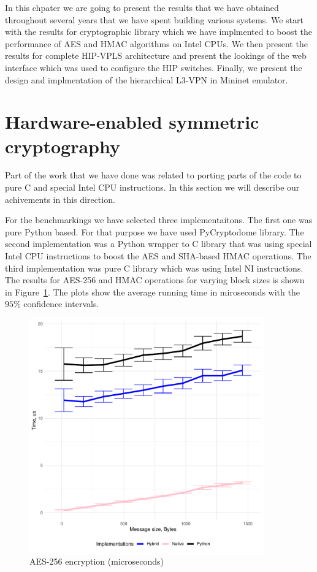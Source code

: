 In this chpater we are going to present the results that we have obtained 
throughout several years that we have spent building various systems. We start 
with the results for cryptographic library which we have implmented to 
boost the performance of AES and HMAC algorithms on Intel CPUs. We then 
present the results for complete HIP-VPLS architecture and present the 
lookings of the web interface which was used to configure the HIP switches.
Finally, we present the design and implmentation of the hierarchical L3-VPN
in Mininet emulator.  

\section{Hardware-enabled symmetric cryptography}

Part of the work that we have done was related to porting parts of the code to pure C 
and special Intel CPU instructions. In this section we will describe our achivements 
in this direction. 

For the benchmarkings we have selected three implementaitons. The first one was pure 
Python based. For that purpose we have used PyCryptodome library. The second implementation
was a Python wrapper to C library that was using special Intel CPU instructions to boost 
the AES and SHA-based HMAC operations. The third implementation was pure C library 
which was using Intel NI instructions. The results for AES-256 and HMAC operations 
for varying block sizes is shown in Figure~\ref{}. The plots show the average 
running time in miroseconds with the $95\%$ confidence intervals. 

\begin{figure}[h!]
    \centering
    \includegraphics[width=0.9\textwidth]{graphics/crypto/aes.pdf}
    \caption{AES-256 encryption (microseconds)}
    \label{fig:aes}
\end{figure}


